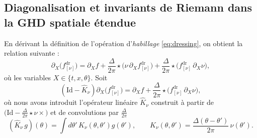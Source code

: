 \subsection{Diagonalisation et invariants de Riemann dans la GHD spatiale étendue}



En dérivant la définition de l'opération d’\emph{habillage} \eqref{eq:dressing}, on obtient la relation suivante :
\begin{equation}\label{chap:GHD:d.dressing.0}
	\partial_X \big( f^{\mathrm{dr}}_{[\nu]} \big) 
	= \partial_X f  +  \frac{\Delta}{2\pi} \star \big( \nu \, \partial_X f^{\mathrm{dr}}_{[\nu]} \big)  
	+ \frac{\Delta}{2\pi} \star \big( f^{\mathrm{dr}}_{[\nu]} \, \partial_X \nu \big), 	
\end{equation}
où les variables \(X \in \{  t, x, \theta \} \).  Soit 
\begin{equation}\label{chap:GHD:d.dressing.0.0}
	\left(\mathrm{Id}-\widehat{K}_{\nu}\right) \partial_X \big( f^{\mathrm{dr}}_{[\nu]} \big) 
	= \partial_X f    
	+ \frac{\Delta}{2\pi} \star \big( f^{\mathrm{dr}}_{[\nu]} \, \partial_X \nu \big), 	
\end{equation}
où nous avons introduit l’opérateur linéaire \(\widehat{K}_{\nu}\) construit à partir de \(\big(\mathrm{Id}-\tfrac{\Delta}{2\pi}\star \nu \times \big)\) et de convolutions par \(\tfrac{\Delta}{2\pi}\) \ie 
\begin{equation}
	(\widehat{K}_{\nu} \,  g)(\theta) = \int d\theta'\, K_{\nu}(\theta,\theta') g(\theta'),\qquad K_{\nu}(\theta,\theta')=\frac{\Delta(\theta-\theta')}{2\pi}\,\nu(\theta').
\end{equation}



